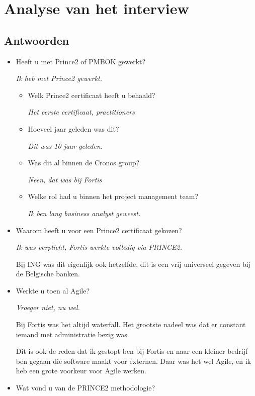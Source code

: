 \documentclass[]{article}
\begin{document}
\section{Analyse van het interview}

\subsection{Antwoorden}
\begin{itemize}
	\item Heeft u met Prince2 of PMBOK gewerkt?
	
		{\it Ik heb met Prince2 gewerkt.}
	\begin{itemize}
		\item Welk Prince2 certificaat heeft u behaald?
		
		{\it Het eerste certificaat, practitioners}
		
		\item Hoeveel jaar geleden was dit?
		
		{\it 
			Dit was 10 jaar geleden.
		}
	
		\item Was dit al binnen de Cronos group?
		
		{\it 
			Neen, dat was bij Fortis
		}
	
		\item Welke rol had u binnen het project management team?
		
		{\it 
			Ik ben lang business analyst geweest.
		}
	\end{itemize}
	\item Waarom heeft u voor een Prince2 certificaat gekozen?
	
	{\it 
		Ik was verplicht, Fortis werkte volledig via PRINCE2.
		
		Bij ING was dit eigenlijk ook hetzelfde, dit is een vrij universeel gegeven bij de Belgische banken.
	}
	\item Werkte u toen al Agile?
	
	{\it 
		Vroeger niet, nu wel.
		
		Bij Fortis was het altijd waterfall. Het grootste nadeel was dat er constant iemand met administratie bezig was.
		
		Dit is ook de reden dat ik gestopt ben bij Fortis en naar een kleiner bedrijf ben gegaan die software maakt voor externen. Daar was het wel Agile, en ik heb een grote voorkeur voor Agile werken.
	}
	\item Wat vond u van de PRINCE2 methodologie?
	

\end{itemize}
\end{document}
